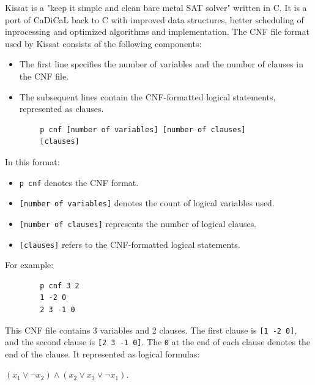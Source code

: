 Kissat is a "keep it simple and clean bare metal SAT solver" written in C.
It is a port of CaDiCaL back to C with improved data structures, better scheduling of inprocessing and optimized algorithms and implementation.
The CNF file format used by Kissat consists of the following components:

\begin{itemize}
    \item The first line specifies the number of variables and the number of clauses in the CNF file.
    \item The subsequent lines contain the CNF-formatted logical statements, represented as clauses.
\end{itemize}

\begin{center}
    \begin{verbatim}
        p cnf [number of variables] [number of clauses]
        [clauses]
    \end{verbatim}
\end{center}

\begin{flushleft}
    In this format:
\end{flushleft}
\begin{itemize}
    \item \texttt{p cnf} denotes the CNF format.
    \item \texttt{[number of variables]} denotes the count of logical variables used.
    \item \texttt{[number of clauses]} represents the number of logical clauses.
    \item \texttt{[clauses]} refers to the CNF-formatted logical statements.
\end{itemize}

For example:
\begin{center}
    \begin{verbatim}
        p cnf 3 2
        1 -2 0
        2 3 -1 0
    \end{verbatim}
\end{center}

This CNF file contains 3 variables and 2 clauses.
The first clause is \texttt{[1 -2 0]}, and the second clause is \texttt{[2 3 -1 0]}.
The \texttt{0} at the end of each clause denotes the end of the clause.
It represented as logical formulas:
\begin{center}
    $(x_1 \vee \neg x_2) \wedge (x_2 \vee x_3 \vee \neg x_1)$.
\end{center}

